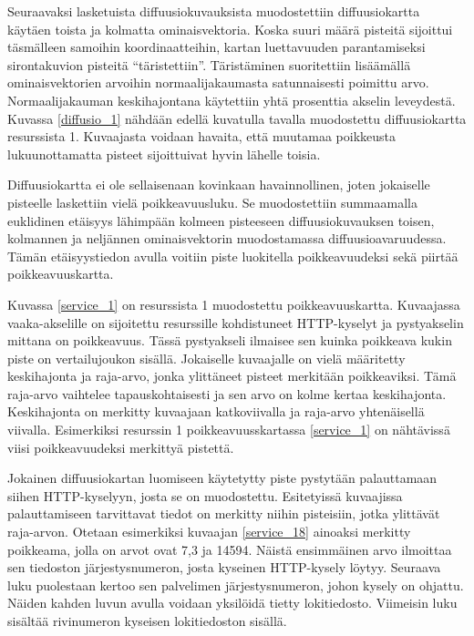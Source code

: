 Seuraavaksi lasketuista diffuusiokuvauksista muodostettiin
diffuusiokartta käytäen toista ja kolmatta ominaisvektoria. Koska
suuri määrä pisteitä sijoittui täsmälleen samoihin koordinaatteihin,
kartan luettavuuden parantamiseksi sirontakuvion pisteitä
``täristettiin''. Täristäminen suoritettiin lisäämällä
ominaisvektorien arvoihin normaalijakaumasta satunnaisesti poimittu
arvo. Normaalijakauman keskihajontana käytettiin yhtä prosenttia
akselin leveydestä. Kuvassa \ref{diffusio_1} nähdään edellä kuvatulla
tavalla muodostettu diffuusiokartta resurssista 1. Kuvaajasta voidaan
havaita, että muutamaa poikkeusta lukuunottamatta pisteet sijoittuivat
hyvin lähelle toisia.

Diffuusiokartta ei ole sellaisenaan kovinkaan havainnollinen, joten
jokaiselle pisteelle laskettiin vielä poikkeavuusluku. Se muodostettiin
summaamalla euklidinen etäisyys lähimpään kolmeen pisteeseen
diffuusiokuvauksen toisen, kolmannen ja neljännen ominaisvektorin
muodostamassa diffuusioavaruudessa. Tämän etäisyystiedon avulla voitiin piste
luokitella poikkeavuudeksi sekä piirtää poikkeavuuskartta.


Kuvassa \ref{service_1} on resurssista 1 muodostettu poikkeavuuskartta. Kuvaajassa vaaka-akselille on sijoitettu resurssille kohdistuneet HTTP-kyselyt
ja pystyakselin mittana on poikkeavuus. Tässä pystyakseli ilmaisee sen kuinka poikkeava kukin piste on vertailujoukon sisällä. Jokaiselle kuvaajalle
on vielä määritetty keskihajonta ja raja-arvo, jonka ylittäneet pisteet merkitään poikkeaviksi. Tämä raja-arvo vaihtelee tapauskohtaisesti ja sen
arvo on kolme kertaa keskihajonta. Keskihajonta on merkitty kuvaajaan katkoviivalla ja raja-arvo yhtenäisellä viivalla. Esimerkiksi resurssin 1 
poikkeavuusskartassa \ref{service_1} on nähtävissä viisi poikkeavuudeksi merkittyä pistettä.

Jokainen diffuusiokartan luomiseen käytetytty piste pystytään
palauttamaan siihen HTTP-kyselyyn, josta se on
muodostettu. Esitetyissä kuvaajissa palauttamiseen tarvittavat tiedot
on merkitty niihin pisteisiin, jotka ylittävät raja-arvon. Otetaan
esimerkiksi kuvaajan \ref{service_18} ainoaksi merkitty poikkeama,
jolla on arvot ovat 7,3 ja 14594. Näistä ensimmäinen arvo ilmoittaa
sen tiedoston järjestysnumeron, josta kyseinen HTTP-kysely
löytyy. Seuraava luku puolestaan kertoo sen palvelimen
järjestysnumeron, johon kysely on ohjattu. Näiden kahden luvun avulla
voidaan yksilöidä tietty lokitiedosto. Viimeisin luku sisältää
rivinumeron kyseisen lokitiedoston sisällä.

